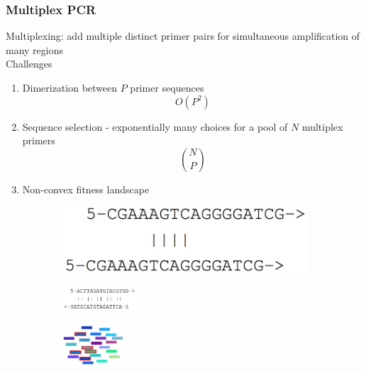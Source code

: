 \documentclass[xcolor=dvipsnames,envcountsect]{beamer}
\begin{document}
\begin{frame}
	\frametitle{Multiplex PCR}
	Multiplexing: add multiple distinct primer pairs for simultaneous amplification of many regions\\
	Challenges
    \begin{multicols}{2}
	\begin{enumerate}
	    \item Dimerization between $P$ primer sequences $$O(P^2)$$ %
	    \item Sequence selection - exponentially many choices for a pool of $N$ multiplex primers $$\binom{N}{P}$$
	    \item Non-convex fitness landscape %
	 \end{enumerate}
	 \columnbreak
	 \begin{figure}
     \begin{subfigure}
         \centering 
         \includegraphics[width=.3\textwidth]{annealing_conn_fwd}
     \end{subfigure}
     \hfill
     \begin{subfigure} %
         \centering
         \includegraphics[width=0.3\textwidth]{annealing_disconn_rev}
     \end{subfigure}
     \begin{subfigure} %
         \centering
         \includegraphics[width=0.25\textwidth]{picto_primerpool}
     \end{subfigure}
     \end{figure}
\end{multicols}
\end{frame}
\end{document}
